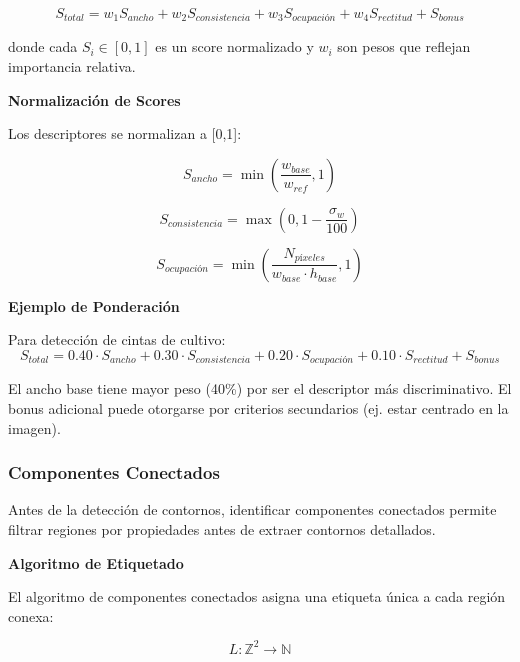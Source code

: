 \begin{equation}
S_{total} = w_1 S_{ancho} + w_2 S_{consistencia} + w_3 S_{ocupación} + w_4 S_{rectitud} + S_{bonus}
\end{equation}

donde cada $S_i \in [0,1]$ es un score normalizado y $w_i$ son pesos que reflejan importancia relativa.

\textbf{Normalización de Scores}

Los descriptores se normalizan a [0,1]:

\begin{equation}
S_{ancho} = \min\left(\frac{w_{base}}{w_{ref}}, 1\right)
\end{equation}

\begin{equation}
S_{consistencia} = \max\left(0, 1 - \frac{\sigma_w}{100}\right)
\end{equation}

\begin{equation}
S_{ocupación} = \min\left(\frac{N_{píxeles}}{w_{base} \cdot h_{base}}, 1\right)
\end{equation}

\textbf{Ejemplo de Ponderación}

Para detección de cintas de cultivo:
\begin{equation}
S_{total} = 0.40 \cdot S_{ancho} + 0.30 \cdot S_{consistencia} + 0.20 \cdot S_{ocupación} + 0.10 \cdot S_{rectitud} + S_{bonus}
\end{equation}

El ancho base tiene mayor peso (40\%) por ser el descriptor más discriminativo. El bonus adicional puede otorgarse por criterios secundarios (ej. estar centrado en la imagen).

\subsubsection{Componentes Conectados}

Antes de la detección de contornos, identificar componentes conectados permite filtrar regiones por propiedades antes de extraer contornos detallados.

\textbf{Algoritmo de Etiquetado}

El algoritmo de componentes conectados asigna una etiqueta única a cada región conexa:

\begin{equation}
L: \mathbb{Z}^2 \to \mathbb{N}
\end{equation}

